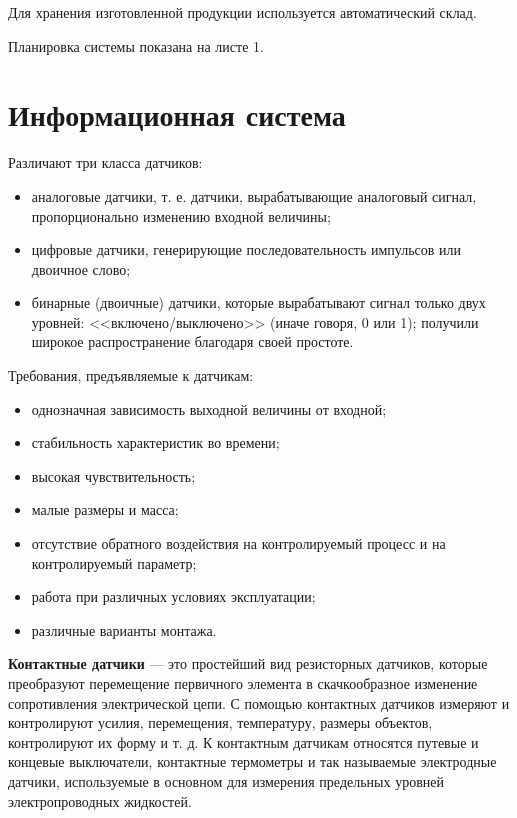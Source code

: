 Для хранения изготовленной продукции используется автоматический склад. 

Планировка системы показана на листе 1.

\section{Информационная система}

Различают три класса датчиков:

\begin{itemize}
    \item аналоговые датчики, т. е. датчики, вырабатывающие аналоговый сигнал, пропорционально изменению входной величины;
    \item цифровые датчики, генерирующие последовательность импульсов или двоичное слово;
    \item бинарные (двоичные) датчики, которые вырабатывают сигнал только двух уровней: <<включено/выключено>> (иначе говоря, 0 или 1); получили широкое распространение благодаря своей простоте.
\end{itemize}

Требования, предъявляемые к датчикам:

\begin{itemize}
    \item однозначная зависимость выходной величины от входной;
    \item стабильность характеристик во времени;
    \item высокая чувствительность;
    \item малые размеры и масса;
    \item отсутствие обратного воздействия на контролируемый процесс и на контролируемый параметр;
    \item работа при различных условиях эксплуатации;
    \item различные варианты монтажа.
\end{itemize}

\textbf{Контактные датчики} --- это простейший вид резисторных датчиков, которые преобразуют перемещение первичного элемента в скачкообразное изменение сопротивления электрической цепи. С помощью контактных датчиков измеряют и контролируют усилия, перемещения, температуру, размеры объектов, контролируют их форму и т. д. К контактным датчикам относятся путевые и концевые выключатели, контактные термометры и так называемые электродные датчики, используемые в основном для измерения предельных уровней электропроводных жидкостей.

